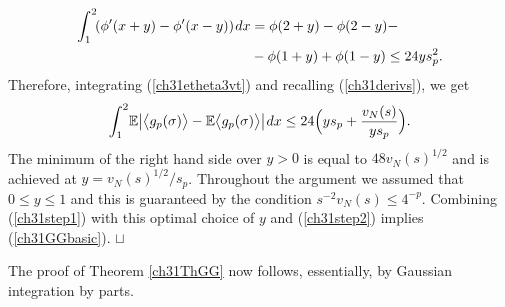 \documentclass[12pt]{article}
\newcommand{\smsp}{\hspace{0.3mm}}
\newcommand{\e}{\mathbb{E}}
\newcommand{\la}{\langle}
\newcommand{\ra}{\rangle}
\newcommand\qed{\hfill\hbox{\rlap{$\sqcap$}$\sqcup$}}
\theoremstyle{nonumberplain}
\begin{document}
\begin{align*}
\int_{1}^{2} \!(\phi'(x+y) - \phi'(x-y))\smsp dx 
&= 
\phi(2+y)-\phi(2-y)-
\\
& -\phi(1+y)+\phi(1-y)
\leq 
24 y s_p^2.
\end{align*}
Therefore, integrating (\ref{ch31etheta3vt}) and recalling (\ref{ch31derivs}), we get
\begin{equation}
\int_{1}^{2}\!  \e \bigl| \bigl\la g_p(\sigma) \bigr\ra-\e \bigl\la g_p(\sigma) \bigr\ra \bigr| \smsp dx
\leq
24 \Bigl(y s_p  + \frac{v_N(s)}{ys_p}\Bigr).
\label{ch31step1}
\end{equation}
The minimum of the right hand side over $y>0$ is equal to $48 v_N(s)^{1/2}$ and is
achieved at $y=v_N(s)^{1/2}/s_p$. Throughout the argument we assumed that $0\leq y\leq 1$ and this is guaranteed by the condition $s^{-2}v_N(s) \leq 4^{-p}$. Combining (\ref{ch31step1}) with this optimal choice of $y$ and (\ref{ch31step2}) implies (\ref{ch31GGbasic}).
\qed

\medskip
\noindent
The proof of Theorem \ref{ch31ThGG} now follows, essentially, by Gaussian integration by parts.
\end{document}
